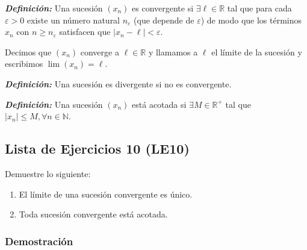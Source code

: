 \documentclass[11pt]{article}
\newcommand{\N}{\mathbb{N}}
\newcommand{\R}{\mathbb{R}}
\newcommand{\bfit}[1]{\textbf{\textit{#1}}}
\begin{document}
\bfit{Definición:}  Una sucesión $(x_n)$ es convergente si $\exists \ell \in \R$ tal que para cada $\varepsilon>0$ existe un número natural $n_\varepsilon$ (que depende de $\varepsilon$) de modo que los términos $x_n$ con $n\geq n_\varepsilon$ satisfacen que $|x_n-\ell|<\varepsilon$.

Decimos que $(x_n)$ converge a $\ell \in \R$ y llamamos a $\ell$ el límite de la sucesión y escribimos $\lim (x_n) = \ell$.

\bfit{Definición:}  Una sucesión es divergente si no es convergente.

\bfit{Definición:}  Una sucesión $(x_n)$ está acotada si $\exists M\in \R^+$ tal que $|x_n|\leq M, \forall n\in \N$.

\subsection*{Lista de Ejercicios 10 (LE10)}

Demuestre lo siguiente:

\begin{enumerate}[label=\alph*)]
    \item El límite de una sucesión convergente es único.
    \item Toda sucesión convergente está acotada.
\end{enumerate}

\subsubsection*{Demostración}
\end{document}
